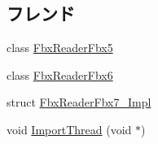 \subsection*{フレンド}
\begin{DoxyCompactItemize}
\item 
class \hyperlink{class_fbx_importer_a66e1b4e7536dcd24ce7d7f48cf6b6e65}{Fbx\+Reader\+Fbx5}
\item 
class \hyperlink{class_fbx_importer_a7f8cca9f018e4d952710060c08cc3983}{Fbx\+Reader\+Fbx6}
\item 
struct \hyperlink{class_fbx_importer_a825b5c450dc04c4042a16fa36d3641c3}{Fbx\+Reader\+Fbx7\+\_\+\+Impl}
\item 
void \hyperlink{class_fbx_importer_aa8465892e0c998ae0aa1ddc6e1ee8552}{Import\+Thread} (void $\ast$)
\end{DoxyCompactItemize}
